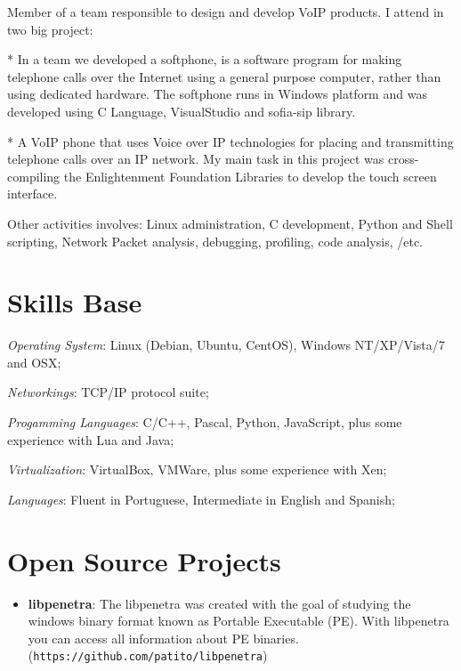 \documentclass[margin]{res}
\begin{document}
\begin{resume}
    Member of a team responsible to design and develop VoIP products. I attend in two big project:

      * In a team we developed a softphone, is a software program for making telephone calls over the Internet using a 
        general purpose computer, rather than using dedicated hardware. The softphone runs in Windows platform and was
        developed using C Language, VisualStudio and sofia-sip library.

      * A VoIP phone that uses Voice over IP technologies for placing and transmitting telephone calls over an IP network. 
        My main task in this project was cross-compiling the Enlightenment Foundation Libraries to develop the touch screen
        interface. 

      Other activities involves: Linux administration, C development, Python and Shell scripting, Network Packet analysis, 
      debugging, profiling, code analysis, /etc.
    

\section{Skills Base}  \textit{Operating System}:  Linux (Debian, Ubuntu, CentOS), Windows NT/XP/Vista/7 and OSX;

			\textit{Networkings}: TCP/IP protocol suite;
  
			\textit{Progamming Languages}: C/C++, Pascal, Python, JavaScript, plus some experience with Lua and Java;
  
			\textit{Virtualization}: VirtualBox, VMWare, plus some experience with Xen;

			\textit{Languages}: Fluent in Portuguese, Intermediate in English and Spanish;
 
\section{Open Source Projects}
		\begin{itemize}
		    \vspace{2mm}
		    \item \textbf{libpenetra}: The libpenetra was created with the goal of studying the windows binary format 
		                               known as Portable Executable (PE). With libpenetra you can access all information
		                               about PE binaries. (\texttt{https://github.com/patito/libpenetra}) \vspace{1mm}
		                               

\end{itemize}
\end{resume}
\end{document}
